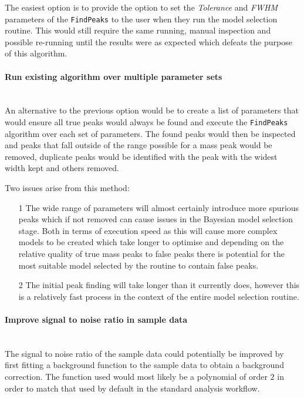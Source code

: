 \documentclass[a4paper]{article}
\begin{document}
The easiest option is to provide the option to set the \textit{Tolerance} and
\textit{FWHM} parameters of the \texttt{FindPeaks} to the user when they run the
model selection routine. This would still require the same running, manual
inspection and possible re-running until the results were as expected which
defeats the purpose of this algorithm.

\paragraph{Run existing algorithm over multiple parameter sets} \hfill \\

An alternative to the previous option would be to create a list of parameters
that would ensure all true peaks would always be found and execute the
\texttt{FindPeaks} algorithm over each set of parameters. The found peaks would
then be inspected and peaks that fall outside of the range possible for a mass
peak would be removed, duplicate peaks would be identified with the peak with
the widest width kept and others removed.

Two issues arise from this method:

\begin{enumerate}
  \item[1]
    The wide range of parameters will almost certainly introduce more spurious
    peaks which if not removed can cause issues in the Bayesian model selection
    stage. Both in terms of execution speed as this will cause more complex
    models to be created which take longer to optimise and depending on the
    relative quality of true mass peaks to false peaks there is potential for
    the most suitable model selected by the routine to contain false peaks.

  \item[2]
    The initial peak finding will take longer than it currently does, however
    this is a relatively fast process in the context of the entire model
    selection routine.
\end{enumerate}

\paragraph{Improve signal to noise ratio in sample data} \hfill \\

The signal to noise ratio of the sample data could potentially be improved by
first fitting a background function to the sample data to obtain a background
correction. The function used would most likely be a polynomial of order $2$ in
order to match that used by default in the standard analysis workflow.
\end{document}
